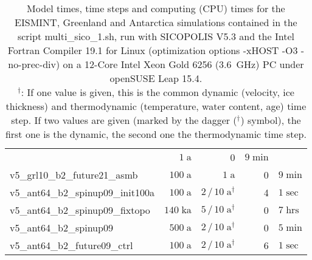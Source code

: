 \documentclass[12pt,a4paper]{article}
\begin{document}
\begin{appendix}
\begin{table}[ht]
\begin{tabular}{lrrr@{.}l}
                                     &    $1\;\mathrm{ a}$\hspace*{1.0em}
                                     &  0&$9\;\mathrm{min}$ \\
v5\_grl10\_b2\_future21\_asmb        &  $100\;\mathrm{ a}$\hspace*{1.47em}
                                     &    $1\;\mathrm{ a}$\hspace*{1.0em}
                                     &  0&$9\;\mathrm{min}$ \\ \hline
v5\_ant64\_b2\_spinup09\_init100a    &  $100\;\mathrm{ a}$\hspace*{1.47em}
                                     & $2\,/\,10\;\mathrm{ a}^{\dagger}$\hspace*{0.6em}
                                     &  4&$1\;\mathrm{sec}$ \\
v5\_ant64\_b2\_spinup09\_fixtopo     &  $140\;\mathrm{ka}$\hspace*{1.0em}
                                     &  $5\,/\,10\;\mathrm{ a}^{\dagger}$\hspace*{0.6em}
                                     &  0&$7\;\mathrm{hrs}$ \\
v5\_ant64\_b2\_spinup09              &  $500\;\mathrm{ a}$\hspace*{1.47em}
                                     & $2\,/\,10\;\mathrm{ a}^{\dagger}$\hspace*{0.6em}
                                     &  0&$5\;\mathrm{min}$ \\
v5\_ant64\_b2\_future09\_ctrl        &  $100\;\mathrm{ a}$\hspace*{1.47em}
                                     & $2\,/\,10\;\mathrm{ a}^{\dagger}$\hspace*{0.6em}
                                     &  6&$1\;\mathrm{sec}$ \\ \hline
\end{tabular}
\caption{Model times, time steps and computing (CPU) times for the EISMINT, Greenland and Antarctica simulations contained in the script multi\_sico\_1.sh, run with SICOPOLIS V5.3 and the Intel Fortran Compiler 19.1 for Linux (optimization options -xHOST -O3 -no-prec-div) on a 12-Core Intel Xeon Gold 6256 (3.6~GHz) PC under openSUSE Leap 15.4.
\protect\\
{}$^\dagger$: If one value is given, this is the common dynamic (velocity, ice thickness) and thermodynamic (temperature, water content, age) time step. If two values are given (marked by the dagger ($^\dagger$) symbol), the first one is the dynamic, the second one the thermodynamic time step.
}
\end{table}
\end{appendix}
\end{document}
